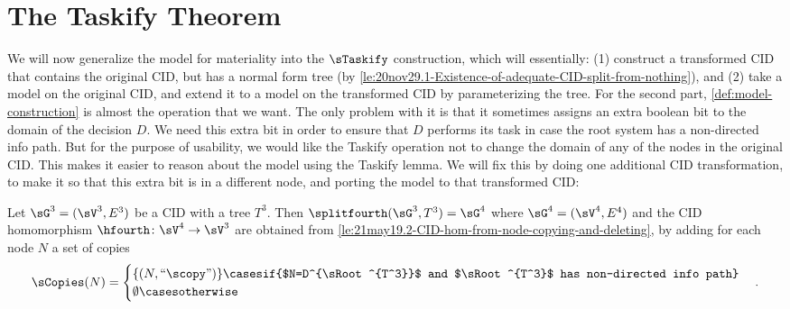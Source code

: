 

\section{The Taskify Theorem}\label{sec:Taskify-construction}
We will now generalize the model for materiality into the $\sTaskify$ construction, which will essentially: (1) construct a transformed CID that contains the original CID, but has a normal form tree (by \autoref{le:20nov29.1-Existence-of-adequate-CID-split-from-nothing}), and (2) take a model on the original CID, and extend it to a model on the transformed CID by parameterizing the tree. For the second part, \autoref{def:model-construction} is almost the operation that we want. The only problem with it is that it sometimes assigns an extra boolean bit to the domain of the decision $D$. We need this extra bit in order to ensure that $D$ performs its task in case the root system 
has a non-directed info path. But for the purpose of usability, we would like the Taskify operation not to change the domain of any of the nodes in the original CID. This makes it easier to reason about the model using the Taskify lemma. We will fix this by doing one additional CID transformation, to make it so that this extra bit is in a different node, and porting the model to that transformed CID:~




\begin{definition} [Transformation 4] \label{def:21jan30.2-fifth-transformation-to-split-root-decision}
Let $\sG^3=(\sV^3,E^3)$ be a CID \withSR with a tree  $T^3$.
Then $\splitfourth(\sG^3,T^3)=\sG^4$ 
where $\sG^4=(\sV^4,E^4)$
and the CID homomorphism $\hfourth\colon \sV^4 \to \sV^3$ are obtained from \autoref{le:21may19.2-CID-hom-from-node-copying-and-deleting}, by adding for each node $N$ a set of copies
    \[\sCopies(N) = \begin{cases} 
        \{(N,``\scopy")\} \casesif {$N=D^{\sRoot^{T^3}}$ and $\sRoot^{T^3}$ has non-directed info path}\\
        \emptyset \casesotherwise
    \end{cases}.\]
\end{definition}







